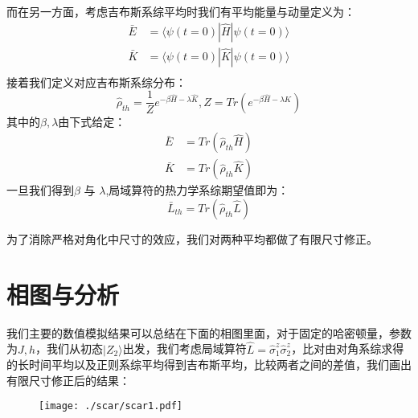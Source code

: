 而在另一方面，考虑吉布斯系综平均时我们有平均能量与动量定义为：
\begin{equation}
\begin{split}
 \bar{E} &= \langle\psi(t=0)|\hat{H}|\psi(t=0)\rangle \\
 \bar{K} &= \langle\psi(t=0)|\hat{K}|\psi(t=0)\rangle\\
\end{split}
\end{equation}
接着我们定义对应吉布斯系综分布：
\begin{equation}
\hat{\rho}_{th} = \frac{1}{Z}e^{-\beta\hat{H}-\lambda\hat{K}}, Z = Tr(e^{-\beta\hat{H}-\lambda\hat{K}})
\end{equation}
其中的$\beta,\lambda$由下式给定：
\begin{equation}
\begin{split}
	\bar{E} &= Tr(\hat{\rho}_{th}\hat{H} ) \\
	\bar{K} &= Tr(\hat{\rho}_{th}\hat{K})
\end{split}
\end{equation}
一旦我们得到$\beta$ 与 $\lambda$,局域算符的热力学系综期望值即为：
\begin{equation}
	\bar{L}_{th} = Tr(\hat{\rho}_{th}\hat{L})
\end{equation}

为了消除严格对角化中尺寸的效应，我们对两种平均都做了有限尺寸修正。

\section{相图与分析}\label{4sec:result}
我们主要的数值模拟结果可以总结在下面的相图里面，对于固定的哈密顿量，参数为$J,h$，我们从初态$|Z_2\rangle$出发，我们考虑局域算符$\hat{L}=\hat{\sigma}_1^z\hat{\sigma}_2^z$，比对由对角系综求得的长时间平均以及正则系综平均得到吉布斯平均，比较两者之间的差值，我们画出有限尺寸修正后的结果：

\begin{figure}[h]
\centering
\texttt{[image: ./scar/scar1.pdf]}
\label{scarphasediag}
\end{figure}

